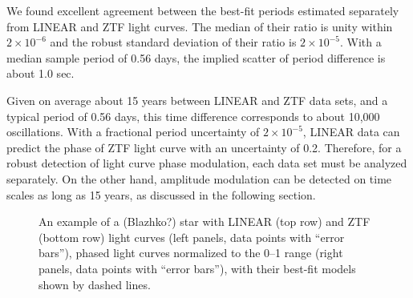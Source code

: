 We found excellent agreement between the best-fit periods estimated separately from LINEAR and ZTF light curves. 
The median of their ratio is unity within $2\times10^{-6}$ and the robust standard deviation of their ratio is
$2\times10^{-5}$. With a median sample period of 0.56 days, the implied scatter of period difference is about 1.0 sec.  

Given on average about 15 years between LINEAR and ZTF data sets, and a typical period of 0.56 days, this time
difference corresponds to about 10,000 oscillations. With a fractional period uncertainty of $2\times10^{-5}$,
LINEAR data can predict the phase of ZTF light curve with an uncertainty of 0.2. Therefore, for a robust detection
of light curve phase modulation, each data set must be analyzed separately. On the other hand, amplitude
modulation can be detected on time scales as long as 15 years, as discussed in the following section. 


\begin{figure}[ht]
  \centering
  \caption{An example of a (Blazhko?) star with LINEAR (top row) and ZTF (bottom row) light curves (left panels,
    data points with ``error bars''), phased light curves normalized to the 0--1 range (right panels, data points
    with ``error bars''), with their best-fit models shown by dashed lines.}
 \label{fig:lc_pair}
\end{figure}



